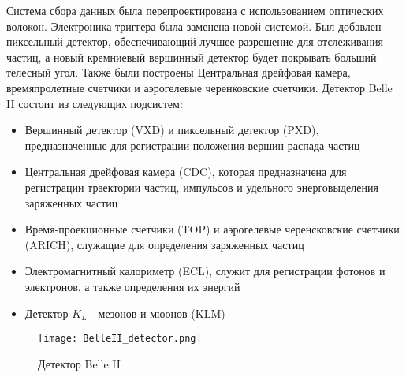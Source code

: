   Система сбора данных была перепроектирована с использованием оптических волокон. Электроника триггера была заменена новой системой. Был добавлен пиксельный детектор, обеспечивающий лучшее разрешение для отслеживания частиц, а новый кремниевый вершинный детектор будет покрывать больший телесный угол. Также были построены Центральная дрейфовая камера, времяпролетные счетчики и аэрогелевые черенковские счетчики. Детектор Belle II состоит из следующих подсистем:
\begin{itemize}
  \item Вершинный детектор (VXD) и пиксельный детектор (PXD), предназначенные для регистрации положения вершин распада частиц
  \item Центральная дрейфовая камера (CDC), которая предназначена для регистрации траектории частиц, импульсов и удельного энерговыделения заряженных частиц
  \item Время-проекционные счетчики (TOP) и аэрогелевые черенсковские счетчики (ARICH), служащие для определения заряженных частиц
  \item Электромагнитный калориметр (ECL), служит для регистрации фотонов и электронов, а также определения их энергий
  \item Детектор $K_{L}$ - мезонов и мюонов (KLM)
\end{itemize}
\begin{figure}[htp]
  \centering
  \texttt{[image: BelleII\_detector.png]}
  \caption{Детектор Belle II}
  \label{fig:galaxy}
\end{figure}
